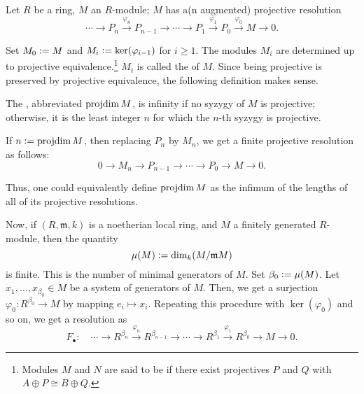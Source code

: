 \documentclass[12pt]{article}
\begin{document}
Let $R$ be a ring, $M$ an $R$-module; $M$ has a(n augmented) projective resolution
\begin{equation*} 
	\cdots \to P_{n} \xrightarrow{\varphi_{n}} P_{n - 1} \to \cdots \to P_{1} \xrightarrow{\varphi_{1}} P_{0} \xrightarrow{\varphi_{0}} M \to 0.
\end{equation*}

Set $M_{0} \vcentcolon= M$ and $M_{i} \vcentcolon= \ker(\varphi_{i - 1})$ for $i \ge 1$. The modules $M_{i}$ are determined up to projective equivalence.\footnote{Modules $M$ and $N$ are said to be  if there exist projectives $P$ and $Q$ with $A \oplus P \cong B \oplus Q$.} $M_{i}$ is called the  of $M$. Since being projective is preserved by projective equivalence, the following definition makes sense.

\begin{defn}
	The , abbreviated $\operatorname{projdim} M$, is infinity if no syzygy of $M$ is projective; otherwise, it is the least integer $n$ for which the $n$-th syzygy is projective.
\end{defn}

If $n \vcentcolon= \operatorname{projdim} M$, then replacing $P_{n}$ by $M_{n}$, we get a finite projective resolution as follows:
\begin{equation*} 
	0 \to M_{n} \to P_{n - 1} \to \cdots \to P_{0} \to M \to 0.
\end{equation*}

Thus, one could equivalently define $\operatorname{projdim} M$ as the infimum of the lengths of all of its projective resolutions.

Now, if $(R, \mathfrak{m}, k)$ is a noetherian local ring, and $M$ a finitely generated $R$-module, then the quantity
\begin{equation*} 
	\mu(M) \vcentcolon= \dim_{k}(M/\mathfrak{m} M)
\end{equation*}
is finite. This is the number of minimal generators of $M$. Set $\beta_{0} \vcentcolon= \mu(M)$. Let $x_{1}, \ldots, x_{\beta_{0}} \in M$ be a system of generators of $M$. Then, we get a surjection $\varphi_{0} : R^{\beta_{0}} \to M$ by mapping $e_{i} \mapsto x_{i}$. Repeating this procedure with $\ker(\varphi_{0})$ and so on, we get a resolution as
\begin{equation*} 
	F_{\bullet} : \quad \cdots \to R^{\beta_{n}} \xrightarrow{\varphi_{n}} R^{\beta_{n - 1}} \to \cdots \to R^{\beta_{1}} \xrightarrow{\varphi_{1}} R^{\beta_{0}} \to M \to 0.
\end{equation*}
\end{document}
